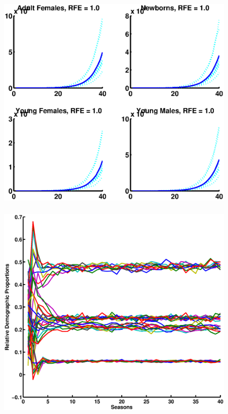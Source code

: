 \documentclass[mathserif]{beamer}
\begin{document}
\begin{frame}
  \begin{center}
    \frametitle{\insertsection}
    \includegraphics[width=0.9\textwidth]{general10}
  \end{center}
\end{frame}

\begin{frame}
  \begin{center}
    \frametitle{\insertsection}
    \includegraphics[width=0.9\textwidth]{relprop}
  \end{center}
\end{frame}
\end{document}
